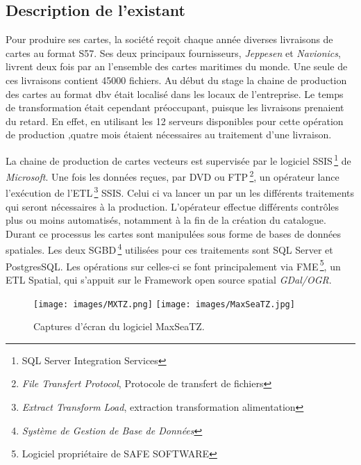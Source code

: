 
\subsection{Description de l'existant}
Pour produire ses cartes, la société \maxsea reçoit chaque année
diverses livraisons de cartes au format S57. Ses deux principaux
fournisseurs, \textit{Jeppesen} et \textit{Navionics}, livrent deux
fois par an l'ensemble des cartes maritimes du monde. Une seule de ces
livraisons contient 45000 fichiers. Au début du stage la chaine de
production des cartes au format dbv était localisé dans les locaux de
l'entreprise. Le temps de transformation était cependant préoccupant,
puisque les livraisons prenaient du retard. En effet, en utilisant les
12 serveurs disponibles pour cette opération de production ,quatre
mois étaient nécessaires au traitement d'une livraison.

La chaine de production de cartes vecteurs est supervisée par le
logiciel SSIS\,\footnote{SQL Server Integration Services} de
\textit{Microsoft}. Une fois les données reçues, par DVD ou
FTP\,\footnote{\textit{File Transfert Protocol}, Protocole de
  transfert de fichiers}, un opérateur lance l'exécution de
l'ETL\,\footnote{\textit{Extract Transform Load}, extraction
  transformation alimentation} SSIS. Celui ci va lancer un par un les
différents traitements qui seront nécessaires à la
production. L'opérateur effectue différents contrôles plus ou moins
automatisés, notamment à la fin de la création du catalogue. Durant ce
processus les cartes sont manipulées sous forme de bases de données
spatiales. Les deux SGBD\,\footnote{\textit{Système de Gestion de Base
    de Données}} utilisées pour ces traitements sont SQL Server et
PostgresSQL. Les opérations sur celles-ci se font principalement via
FME\,\footnote{Logiciel propriétaire de SAFE SOFTWARE}, un ETL
Spatial, qui s'appuit sur le Framework open source spatial
\textit{GDal/OGR}.



\begin{figure}[h!]
  \caption{Captures d'écran du logiciel MaxSeaTZ.}
  \centering
    \texttt{[image: images/MXTZ.png]}
    \texttt{[image: images/MaxSeaTZ.jpg]}
\end{figure}


